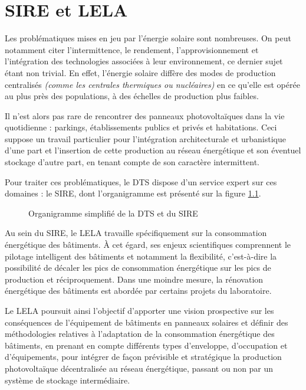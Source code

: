 \chapter{SIRE et LELA}\label{ch:sire-et-lela}

Les problématiques mises en jeu par l'énergie solaire sont nombreuses.
On peut notamment citer l'intermittence, le rendement, l'approvisionnement et l'intégration des technologies associées à leur environnement, ce dernier sujet étant non trivial.
En effet, l'énergie solaire diffère des modes de production centralisés \textit{(comme les centrales thermiques ou nucléaires)} en ce qu'elle est opérée au plus près des populations, à des échelles de production plus faibles.

Il n'est alors pas rare de rencontrer des panneaux photovoltaïques dans la vie quotidienne : parkings, établissements publics et privés et habitations.
Ceci suppose un travail particulier pour l'intégration architecturale et urbanistique d'une part et l'insertion de cette production au réseau énergétique et son éventuel stockage d'autre part, en tenant compte de son caractère intermittent.

Pour traiter ces problématiques, le \gls{DTS} dispose d'un service expert sur ces domaines : le \gls{SIRE}, dont l'organigramme est présenté sur la figure \ref{fig:organigramme-DTS}.
\begin{figure}[H]
    \centering
    \fbox{}
    \caption{Organigramme simplifié de la DTS et du SIRE}
    \label{fig:organigramme-DTS}
\end{figure}

\newpage Au sein du \gls{SIRE}, le \gls{LELA} travaille spécifiquement sur la consommation énergétique des bâtiments.
À cet égard, ses enjeux scientifiques comprennent le pilotage intelligent des bâtiments et notamment la flexibilité, c'est-à-dire la possibilité de décaler les pics de consommation énergétique sur les pics de production et réciproquement.
Dans une moindre mesure, la rénovation énergétique des bâtiments est abordée par certains projets du laboratoire.

Le LELA poursuit ainsi l'objectif d'apporter une vision prospective sur les conséquences de l'équipement de bâtiments en panneaux solaires et définir des méthodologies relatives à l'adaptation de la consommation
énergétique des bâtiments, en prenant en compte différents types d’enveloppe, d'occupation et d'équipements, pour intégrer de façon prévisible et stratégique la production photovoltaïque décentralisée au réseau énergétique, passant ou non par un système de stockage intermédiaire.

